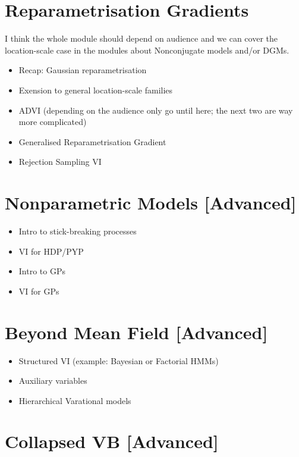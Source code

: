 \documentclass[11pt, a4paper]{article}
\begin{document}
\section{Reparametrisation Gradients}

I think the whole module should depend on audience and we can cover the location-scale case in the modules about Nonconjugate models and/or DGMs.

\begin{itemize}
\item Recap: Gaussian reparametrisation 
\item Exension to general location-scale families \citep{TitsiasLazarogredilla:2014}
\item ADVI (depending on the audience only go until here; the next two are way more complicated) \citep{KucukelbirEtAl:2017}
\item Generalised Reparametrisation Gradient \citep{RuizEtAl:2016}
\item Rejection Sampling VI \citep{NaessethEtAl:2017}
\end{itemize}

\section{Nonparametric Models [Advanced]}

\begin{itemize}
\item Intro to stick-breaking processes \citep{IshwaranJames:2001}
\item VI for HDP/PYP \citep{WangEtAl:2011}
\item Intro to GPs
\item VI for GPs
\end{itemize}

\section{Beyond Mean Field [Advanced]}
\begin{itemize}
\item Structured VI (example: Bayesian or Factorial HMMs)
\item Auxiliary variables
\item Hierarchical Varational models 
\end{itemize}

\section{Collapsed VB [Advanced]}
\end{document}
